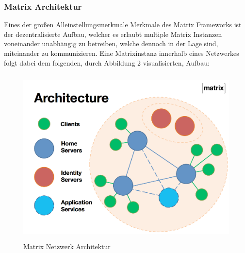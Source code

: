 \subsubsection{Matrix Architektur}\label{chapter:aemn}
Eines der großen Alleinstellungsmerkmale Merkmale des Matrix Frameworks ist der dezentralisierte Aufbau, welcher es erlaubt multiple Matrix Instanzen voneinander unabhängig zu betreiben, welche dennoch in der Lage sind, miteinander zu kommunizieren. Eine Matrixinstanz innerhalb eines Netzwerkes folgt dabei dem folgenden, durch Abbildung 2 visualisierten, Aufbau:

\begin{figure}[htb]
    \centering
    \includegraphics[height=9cm]{graphics/ma.png}
    \caption[Matrix Netzwerk Architektur]{Matrix Netzwerk Architektur\footnotemark}
    \label{abb:DHBWLogo}
\end{figure}

